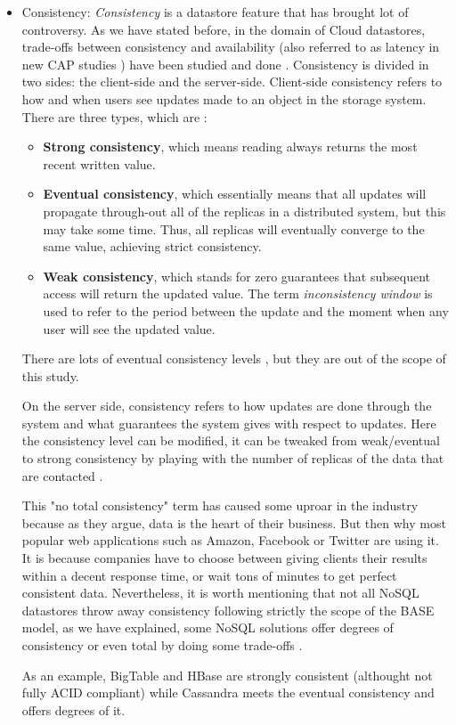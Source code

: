 \begin{itemize}

\item Consistency:
\textit{Consistency} is a datastore feature that has brought lot of controversy. As we have stated before, in the domain of Cloud datastores, trade-offs between consistency and availability (also referred to as latency in new CAP studies \cite{abadi2012consistency}) have been studied and done \cite{brewer2012cap} \cite{gilbert2012perspectives}. Consistency is divided in two sides: the client-side and the server-side. Client-side consistency refers to how and when users see updates made to an object in the storage system. There are three types, which are \cite{vogels2009eventually}:
\begin{itemize}
 \item \textbf{Strong consistency}, which means reading always returns the most recent written value.
\item \textbf{Eventual consistency}, which essentially means that all updates will propagate through-out all of the replicas in a distributed system, but this may take some time. Thus, all replicas will eventually converge to the same value, achieving strict consistency. 
\item \textbf{Weak consistency}, which stands for zero guarantees that subsequent access will return the updated value. The term \textit{inconsistency window} is used to refer to the period between the update and the moment when any user will see the updated value.
\end{itemize}

There are lots of eventual consistency levels \cite{wiki:consistency}, but they are out of the scope of this study.
\par
On the server side, consistency refers to how updates are done through the system and what guarantees the system gives with respect to updates. Here the consistency level can be modified, it can be tweaked from weak/eventual to strong consistency by playing with the number of replicas of the data that are contacted \cite{vogels2009eventually}.
\par
This "no total consistency" term has caused some uproar in the industry because as they argue, data is the heart of their business. But then why most popular web applications such as Amazon, Facebook or Twitter are using it. It is because companies have to choose between giving clients their results within a decent response time, or wait tons of minutes to get perfect consistent data. Nevertheless, it is worth mentioning that not all NoSQL datastores throw away consistency following strictly the scope of the BASE model, as we have explained, some NoSQL solutions offer degrees of consistency or even total by doing some trade-offs \cite{chang2008bigtable} \cite{cooper2008pnuts} \cite{ApacheHBase}.
\par
As an example, BigTable and HBase are strongly consistent (althought not fully ACID compliant) while Cassandra meets the eventual consistency and offers degrees of it.
\end{itemize}

